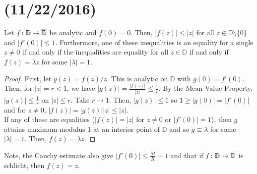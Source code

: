 \documentclass[11pt,leqno,oneside]{amsart}
\numberwithin{thm}{section}
\newcommand{\D}{\mathbb{D}}
\begin{document}
  \section{(11/22/2016)}
  \begin{lem}
    Let $f\from \D \to \overline{\D}$ be analytic and $f(0) = 0$. Then,
    $|f(z)| \leq |z|$ for all $z \in \D \setminus \{0\}$ and $|f'(0)|
    \leq 1$. Furthermore, one of these inequalities is an equality
    for a single $z \neq 0$ if and only if the inequalities are equality for
    all $z \in \D$ if and only if $f(z) = \lambda z$ for some
    $|\lambda| = 1$.
  \end{lem}
  \begin{proof}
    First, let $g(z) = f(z)/z$. This is analytic on $\D$ with $g(0) =
    f'(0)$. Then, for $|z| = r < 1$, we have $|g(z)| =
    \frac{|f(z)|}{|z|} \leq \frac{1}{r}$. By the Mean Value Property,
    $|g(z)| \leq \frac{1}{r}$ on $|z| \leq r$. Take $r \to 1$. Then,
    $|g(z)| \leq 1$ so $1 \geq |g(0)| = |f'(0)|$ and for $z \neq 0$,
    $|f(z)| = |g(z)||z| \leq |z|$. \\

    If any of these are equalities ($|f(z)| = |z|$ for $z \neq 0$ or
    $|f'(0)| = 1$), then $g$ attains maximum modulus 1 at an interior
    point of $\D$ and so $g \equiv \lambda$ for some $|\lambda| =
    1$. Then, $f(z) = \lambda z$.
  \end{proof}
  Note, the Cauchy estimate also give $|f'(0)| \leq \frac{M}{R} = 1$
  and that if $f\from \D \to \D$ is schlicht, then $f(z) = z$. \\
\end{document}
